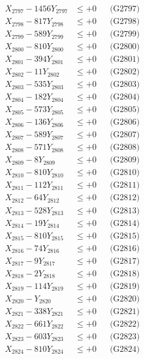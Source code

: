 \documentclass[a4paper,10pt]{article}
\begin{document}
{\begin{align}
X_{2797} - 1456Y_{2797} &\leq +0 && \text{(G2797)} \\
X_{2798} - 817Y_{2798} &\leq +0 && \text{(G2798)} \\
X_{2799} - 589Y_{2799} &\leq +0 && \text{(G2799)} \\
X_{2800} - 810Y_{2800} &\leq +0 && \text{(G2800)} \\
\allowbreak
X_{2801} - 394Y_{2801} &\leq +0 && \text{(G2801)} \\
X_{2802} - 11Y_{2802} &\leq +0 && \text{(G2802)} \\
X_{2803} - 535Y_{2803} &\leq +0 && \text{(G2803)} \\
X_{2804} - 182Y_{2804} &\leq +0 && \text{(G2804)} \\
X_{2805} - 573Y_{2805} &\leq +0 && \text{(G2805)} \\
X_{2806} - 136Y_{2806} &\leq +0 && \text{(G2806)} \\
X_{2807} - 589Y_{2807} &\leq +0 && \text{(G2807)} \\
X_{2808} - 571Y_{2808} &\leq +0 && \text{(G2808)} \\
X_{2809} - 8Y_{2809} &\leq +0 && \text{(G2809)} \\
X_{2810} - 810Y_{2810} &\leq +0 && \text{(G2810)} \\
\allowbreak
X_{2811} - 112Y_{2811} &\leq +0 && \text{(G2811)} \\
X_{2812} - 64Y_{2812} &\leq +0 && \text{(G2812)} \\
X_{2813} - 528Y_{2813} &\leq +0 && \text{(G2813)} \\
X_{2814} - 19Y_{2814} &\leq +0 && \text{(G2814)} \\
X_{2815} - 810Y_{2815} &\leq +0 && \text{(G2815)} \\
X_{2816} - 74Y_{2816} &\leq +0 && \text{(G2816)} \\
X_{2817} - 9Y_{2817} &\leq +0 && \text{(G2817)} \\
X_{2818} - 2Y_{2818} &\leq +0 && \text{(G2818)} \\
X_{2819} - 114Y_{2819} &\leq +0 && \text{(G2819)} \\
X_{2820} - Y_{2820} &\leq +0 && \text{(G2820)} \\
\allowbreak
X_{2821} - 338Y_{2821} &\leq +0 && \text{(G2821)} \\
X_{2822} - 661Y_{2822} &\leq +0 && \text{(G2822)} \\
X_{2823} - 603Y_{2823} &\leq +0 && \text{(G2823)} \\
X_{2824} - 810Y_{2824} &\leq +0 && \text{(G2824)} \\

\end{align}}
\end{document}
